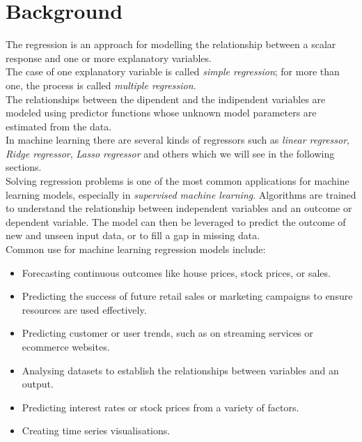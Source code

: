 \documentclass[a4paper,10pt]{report}
\begin{document}
\section{Background}
The regression is an approach for modelling the relationship between a scalar response and one or more explanatory variables.\\
The case of one explanatory variable is called \emph{simple regression}; for more than one, the process is called \emph{multiple regression}.\\
The relationships  between the dipendent and the indipendent variables are modeled using predictor functions whose unknown model parameters are estimated from the data.\\
In machine learning there are several kinds of regressors such as \emph{linear regressor}, \emph{Ridge regressor}, \emph{Lasso regressor} and others which we will see in the following sections.\\
Solving regression problems is one of the most common applications for machine learning models, especially in \emph{supervised machine learning}. Algorithms are trained to understand the relationship between independent variables and an outcome or dependent variable. The model can then be leveraged to predict the outcome of new and unseen input data, or to fill a gap in missing data.\\
Common use for machine learning regression models include: 
 
\begin{itemize}
\item Forecasting continuous outcomes like house prices, stock prices, or sales.
\item Predicting the success of future retail sales or marketing campaigns to ensure resources are used effectively. 
\item Predicting customer or user trends, such as on streaming services or ecommerce websites. 
\item Analysing datasets to establish the relationships between variables and an output. 
\item Predicting interest rates or stock prices from a variety of factors. 
\item Creating time series visualisations. 
\end{itemize}
\end{document}
